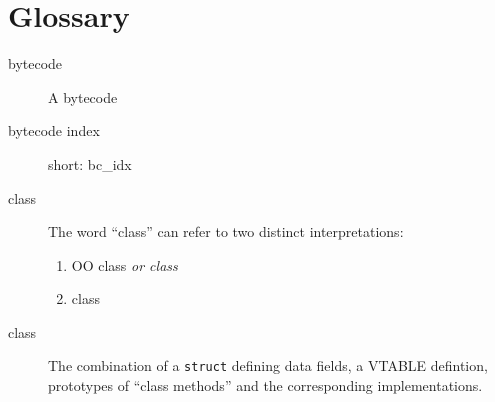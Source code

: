 \section{Glossary}
\label{sec:glossary}


\begin{description}
\item[bytecode] A bytecode
\item[bytecode index] short: bc\_idx
\item[class] The word ``class'' can refer to two distinct
  interpretations:
  \begin{enumerate}
  \item OO class \emph{or \C class}
  \item \SOM class
  \end{enumerate}
\item[\C class] The combination of a  \C  \lstinline|struct| defining
  data fields, a VTABLE defintion, prototypes of ``class methods''  and the corresponding
  implementations.


\end{description}
